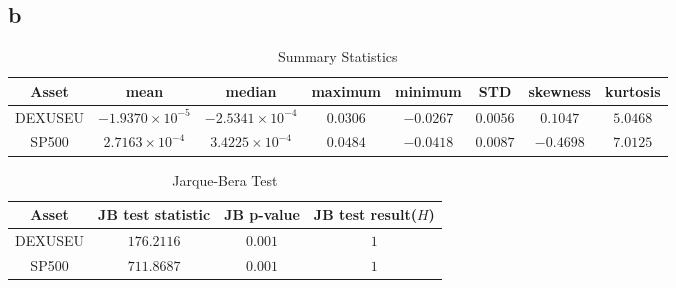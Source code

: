 \documentclass{report}
\begin{document}
\subsection*{b}

 \begin{table}[H]
	\begin{center}
		\caption{Summary Statistics}
		\label{tab:table1}
		\vspace{2mm}
		\begin{tabular}{c|c|c|c|c|c|c|c|} 
			
			
			\textbf{Asset} & \textbf{mean}&  \textbf{median}& \textbf{maximum}&\textbf{minimum}&\textbf{STD}&\textbf{skewness}&\textbf{kurtosis}\\
			\hline
			
			DEXUSEU &  $-1.9370\times 10^{-5}$& $-2.5341\times 10^{-4}$&$0.0306$&$-0.0267$ &$0.0056$&$0.1047$ &$5.0468$   \\
			
			SP500 & $2.7163\times 10^{-4}$&$3.4225\times 10^{-4}$ &$0.0484$&$-0.0418$&$0.0087$&$-0.4698$&$7.0125$   \\
			
		\end{tabular}
	\end{center}
\end{table}


 \begin{table}[H]
	\begin{center}
		\caption{Jarque-Bera Test}
		\label{tab:table2}
		\vspace{2mm}
		\begin{tabular}{c|c|c|c|} 
			
			
			\textbf{Asset} & \textbf{JB test statistic}&  \textbf{JB p-value}& \textbf{JB test result($H$)}\\
			\hline
			
			DEXUSEU &  $176.2116$& $0.001$&$1$   \\
			
			SP500 & $711.8687$&$0.001$ &$1$ \\
			
		\end{tabular}
	\end{center}
\end{table}
\end{document}

